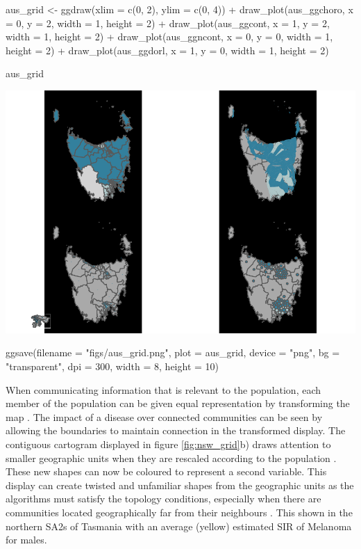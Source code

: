 \begin{Schunk}
\begin{Sinput}
aus_grid <- ggdraw(xlim = c(0, 2), ylim = c(0, 4)) +
  draw_plot(aus_ggchoro, x = 0, y = 2, width = 1, height = 2) +
  draw_plot(aus_ggcont,  x = 1, y = 2, width = 1, height = 2) +
  draw_plot(aus_ggncont, x = 0, y = 0, width = 1, height = 2) +
  draw_plot(aus_ggdorl,  x = 1, y = 0, width = 1, height = 2)

aus_grid
\end{Sinput}

\includegraphics{kobakian-cook_files/figure-latex/mapgrid-1} \begin{Sinput}
ggsave(filename = "figs/aus_grid.png", plot = aus_grid,
  device = "png", bg = "transparent", dpi = 300, width = 8, height = 10)
\end{Sinput}
\end{Schunk}

When communicating information that is relevant to the population, each
member of the population can be given equal representation by
transforming the map \citep{TVSSS}. The impact of a disease over
connected communities can be seen by allowing the boundaries to maintain
connection in the transformed display. The contiguous cartogram
displayed in figure \ref{fig:nsw_grid}b) draws attention to smaller
geographic units when they are rescaled according to the population
\citep{DMAHP}. These new shapes can now be coloured to represent a
second variable. This display can create twisted and unfamiliar shapes
from the geographic units as the algorithms must satisfy the topology
conditions, especially when there are communities located geographically
far from their neighbours \citep{TVSSS}. This shown in the northern SA2s
of Tasmania with an average (yellow) estimated SIR of Melanoma for
males.

